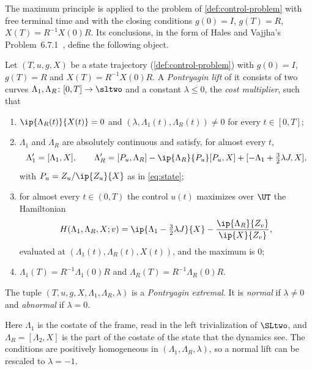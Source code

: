 The maximum principle is applied to the problem of \cref{def:control-problem} with free terminal
time and with the closing conditions $g(0)=I$, $g(T)=R$, $X(T)=R^{-1}X(0)R$. Its conclusions, in
the form of Hales and Vajjha's Problem~6.7.1~\cite{HalesVajjha2024}, define the following object.

\begin{definition}\label{def:pmp-extremal}
Let $(T,u,g,X)$ be a state trajectory (\cref{def:control-problem}) with $g(0)=I$, $g(T)=R$ and
$X(T)=R^{-1}X(0)R$. A \emph{Pontryagin lift} of it consists of two curves
$\Lambda_1,\Lambda_R\colon[0,T]\to\sltwo$ and a constant $\lambda\le0$, the \emph{cost
multiplier}, such that
\begin{enumerate}
\item $\ip{\Lambda_R(t)}{X(t)}=0$ and $(\lambda,\Lambda_1(t),\Lambda_R(t))\ne0$ for every
  $t\in[0,T]$;
\item $\Lambda_1$ and $\Lambda_R$ are absolutely continuous and satisfy, for almost every $t$,
  \begin{equation}\label{red:costate}
  \Lambda_1'=[\Lambda_1,X],\qquad
  \Lambda_R'=[P_u,\Lambda_R]-\ip{\Lambda_R}{P_u}[P_u,X]+[-\Lambda_1+\tfrac32\lambda J,X],
  \end{equation}
  with $P_u=Z_u/\ip{Z_u}{X}$ as in \cref{eq:state};
\item for almost every $t\in(0,T)$ the control $u(t)$ maximizes over $\UT$ the Hamiltonian
  \begin{equation}\label{red:hamiltonian}
  H(\Lambda_1,\Lambda_R,X;v)=\ip{\Lambda_1-\tfrac32\lambda J}{X}
  -\frac{\ip{\Lambda_R}{Z_v}}{\ip{X}{Z_v}},
  \end{equation}
  evaluated at $(\Lambda_1(t),\Lambda_R(t),X(t))$, and the maximum is $0$;
\item $\Lambda_1(T)=R^{-1}\Lambda_1(0)R$ and $\Lambda_R(T)=R^{-1}\Lambda_R(0)R$.
\end{enumerate}
The tuple $(T,u,g,X,\Lambda_1,\Lambda_R,\lambda)$ is a \emph{Pontryagin extremal}. It is \emph{normal} if $\lambda\ne0$ and
\emph{abnormal} if $\lambda=0$.
\end{definition}

Here $\Lambda_1$ is the costate of the frame, read in the left trivialization of $\SLtwo$, and
$\Lambda_R=[\Lambda_2,X]$ is the part of the costate of the state that the dynamics see. The
conditions are positively homogeneous in $(\Lambda_1,\Lambda_R,\lambda)$, so a normal lift can be
rescaled to $\lambda=-1$.

